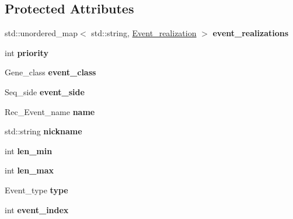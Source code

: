 \subsection*{Protected Attributes}
\begin{DoxyCompactItemize}
\item 
\mbox{\label{classRec__Event_a07fc418d22098c2926653834fa0436c5}} 
std\+::unordered\+\_\+map$<$ std\+::string, \hyperlink{structEvent__realization}{Event\+\_\+realization} $>$ {\bfseries event\+\_\+realizations}
\item 
\mbox{\label{classRec__Event_abd0cbac0857932ab119236558ca8fff2}} 
int {\bfseries priority}
\item 
\mbox{\label{classRec__Event_a484c20b2089a38fe1b265c8d01e6111e}} 
Gene\+\_\+class {\bfseries event\+\_\+class}
\item 
\mbox{\label{classRec__Event_a39522384697c7db8d3798d58e84740f1}} 
Seq\+\_\+side {\bfseries event\+\_\+side}
\item 
\mbox{\label{classRec__Event_a4884eb9d3d3d08fb90e04e94dda014c4}} 
Rec\+\_\+\+Event\+\_\+name {\bfseries name}
\item 
\mbox{\label{classRec__Event_ad7a94cea0adcd33d96138b52520d3645}} 
std\+::string {\bfseries nickname}
\item 
\mbox{\label{classRec__Event_ac90c7ca13ec2652ff60b6d8955608156}} 
int {\bfseries len\+\_\+min}
\item 
\mbox{\label{classRec__Event_a737c3083cf8b51493afbd81f4b77f32f}} 
int {\bfseries len\+\_\+max}
\item 
\mbox{\label{classRec__Event_a0c88bea7d614edcbc669e31f327bc526}} 
Event\+\_\+type {\bfseries type}
\item 
\mbox{\label{classRec__Event_af2001da20d37833fde0796a925dd6a76}} 
int {\bfseries event\+\_\+index}
\item 
\mbox{\label{classRec__Event_af6cfd37096cac09c44dc03284b8bbf37}} 

\end{DoxyCompactItemize}

